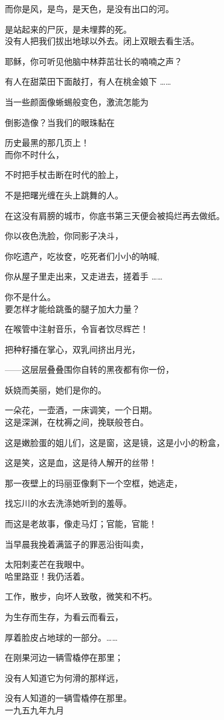 而你是风，是鸟，是天色，是没有出口的河。

是站起来的尸灰，是未埋葬的死。\\


没有人把我们拔出地球以外去。闭上双眼去看生活。

耶稣，你可听见他脑中林莽茁壮长的喃喃之声？

有人在甜菜田下面敲打，有人在桃金娘下 \dots \dots

当一些颜面像蜥蜴般变色，激流怎能为

倒影造像？当我们的眼珠黏在

历史最黑的那几页上！\\


而你不时什么，

不时把手杖击断在时代的脸上，

不是把曙光缠在头上跳舞的人。

在这没有肩膀的城市，你底书第三天便会被捣烂再去做纸。

你以夜色洗脸，你同影子决斗，

你吃遗产，吃妆奁，吃死者们小小的呐喊,

你从屋子里走出来，又走进去，搓着手 \dots\dots

你不是什么。\\


要怎样才能给跳蚤的腿子加大力量？

在喉管中注射音乐，令盲者饮尽辉芒！

把种籽播在掌心，双乳间挤出月光，

——这层层叠叠围你自转的黑夜都有你一份，

妖娆而美丽，她们是你的。

一朵花，一壶酒，一床调笑，一个日期。\\



这是深渊，在枕褥之间，挽联般苍白。

这是嫩脸蛋的姐儿们，这是窗，这是镜，这是小小的粉盒，

这是笑，这是血，这是待人解开的丝带！

那一夜壁上的玛丽亚像剩下一个空框，她逃走，

找忘川的水去洗涤她听到的羞辱。

而这是老故事，像走马灯；官能，官能！

当早晨我挽着满篮子的罪恶沿街叫卖，

太阳刺麦芒在我眼中。\\


哈里路亚！我仍活着。

工作，散步，向坏人致敬，微笑和不朽。

为生存而生存，为看云而看云，

厚着脸皮占地球的一部分。\dots \dots

在刚果河边一辆雪橇停在那里；

没有人知道它为何滑的那样远，

没有人知道的一辆雪橇停在那里。\\

一九五九年九月
